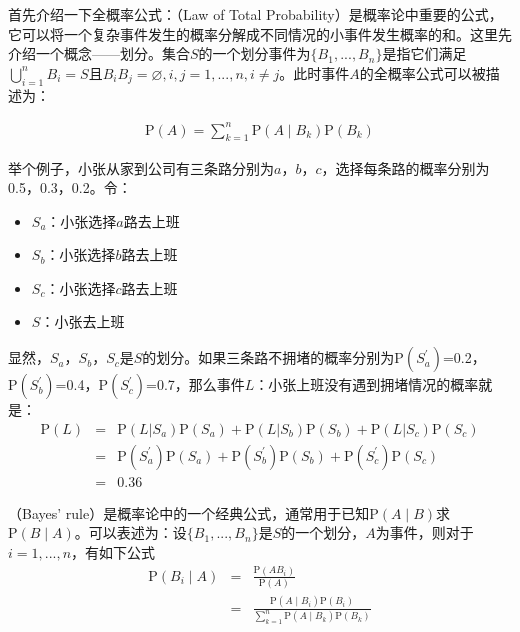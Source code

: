 \parinterval 首先介绍一下全概率公式：{\small{}}（Law of Total Probability）是概率论中重要的公式，它可以将一个复杂事件发生的概率分解成不同情况的小事件发生概率的和。这里先介绍一个概念——划分。集合$S$的一个划分事件为$\{B_1,...,B_n\}$是指它们满足$\bigcup_{i=1}^n B_i=S \textrm{且}B_iB_j=\varnothing , i,j=1,...,n,i\neq j$。此时事件$A$的全概率公式可以被描述为：

\begin{eqnarray}
\textrm{P}(A)=\sum_{k=1}^n \textrm{P}(A \mid B_k)\textrm{P}(B_k)
\label{eq:2-9}
\end{eqnarray}

\parinterval 举个例子，小张从家到公司有三条路分别为$a$，$b$，$c$，选择每条路的概率分别为0.5，0.3，0.2。令：

\begin{itemize}
\vspace{0.5em}
\item $S_a$：小张选择$a$路去上班
\vspace{0.5em}
\item $S_b$：小张选择$b$路去上班
\vspace{0.5em}
\item $S_c$：小张选择$c$路去上班
\vspace{0.5em}
\item $S$：小张去上班
\vspace{0.5em}
\end{itemize}

\parinterval 显然，$S_a$，$S_b$，$S_c$是$S$的划分。如果三条路不拥堵的概率分别为$\textrm{P}({S_{a}^{'}})$=0.2， $\textrm{P}({S_{b}^{'}})$=0.4，$\textrm{P}({S_{c}^{'}})$=0.7，那么事件$L$：小张上班没有遇到拥堵情况的概率就是：
\begin{eqnarray}
{\textrm{P}(L)} &=& {\textrm{P}( L| S_a )\textrm{P}(S_a )+\textrm{P}( L| S_b )\textrm{P}(S_b )+\textrm{P}( L| S_c )\textrm{P}(S_c )}\nonumber \\
& = &{\textrm{P}({S_{a}^{'}})\textrm{P}(S_a)+\textrm{P}({S_{b}^{'}})\textrm{P}(S_b)+\textrm{P}({S_{c}^{'}})\textrm{P}(S_c) }\nonumber \\
& = &{0.36}
\label{eq:2-10}
\end{eqnarray}

（Bayes' rule）是概率论中的一个经典公式，通常用于已知$\textrm{P}(A \mid B)$求$\textrm{P}(B \mid A)$。可以表述为：设$\{B_1,...,B_n\}$是$S$的一个划分，$A$为事件，则对于$i=1,...,n$，有如下公式
\begin{eqnarray}
\textrm{P}(B_i \mid A) & = & \frac {\textrm{P}(A  B_i)} { \textrm{P}(A) } \nonumber \\
                                   & = & \frac {\textrm{P}(A \mid B_i)\textrm{P}(B_i) } { \sum_{k=1}^n\textrm{P}(A \mid B_k)\textrm{P}(B_k) }
\label{eq:2-11}
\end{eqnarray}

